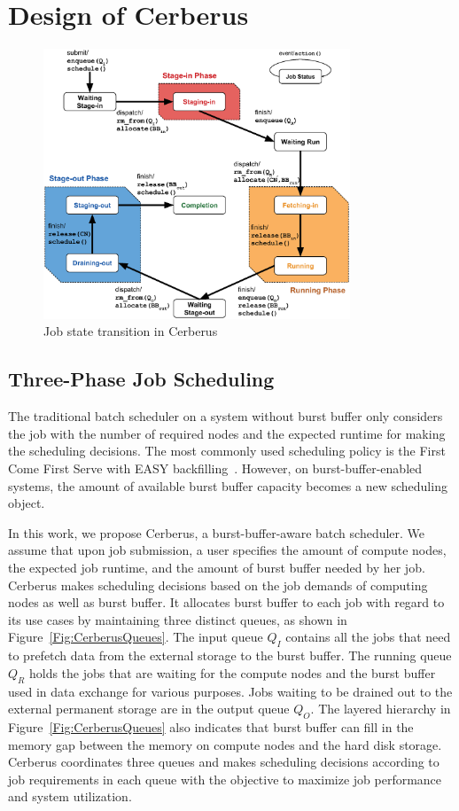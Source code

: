 \section{Design of Cerberus}
\label{Sec:Scheduler}

\begin{figure}[htp]
\centering
        \includegraphics[width=3.6in]{3PhaseJobFSM}
        \caption{Job state transition in Cerberus}
\label{Fig:JobFSM}
\end{figure}

\subsection{Three-Phase Job Scheduling}

The traditional batch scheduler on a system without burst buffer only considers
the job with the number of required nodes and the expected runtime
for making the scheduling decisions.
The most commonly used scheduling policy is the First Come First Serve with EASY backfilling~\cite{tsafrir-tpds-2007}.
However, on burst-buffer-enabled systems,
the amount of available burst buffer capacity becomes a new scheduling object.

In this work,
we propose Cerberus, a burst-buffer-aware batch scheduler.
We assume that upon job submission, a user specifies the amount of compute nodes, 
the expected job runtime, and the amount of burst buffer needed by her job.
Cerberus makes scheduling decisions based on the job demands of computing nodes as well as burst buffer.
It allocates burst buffer to each job with regard to its use cases
by maintaining three distinct queues, as shown in Figure~\ref{Fig:CerberusQueues}.
The input queue $Q_I$ contains all the jobs that need to prefetch data
from the external storage to the burst buffer.
The running queue $Q_R$ holds the jobs that are waiting for the compute nodes and
the burst buffer used in data exchange for various purposes.
Jobs waiting to be drained out to the external permanent storage are in the output queue $Q_O$.
The layered hierarchy in Figure~\ref{Fig:CerberusQueues} also indicates that burst buffer
can fill in the memory gap between the memory on compute nodes and the hard disk storage.
Cerberus coordinates three queues and makes scheduling decisions according to job requirements
in each queue with the objective to maximize job performance and system utilization.

